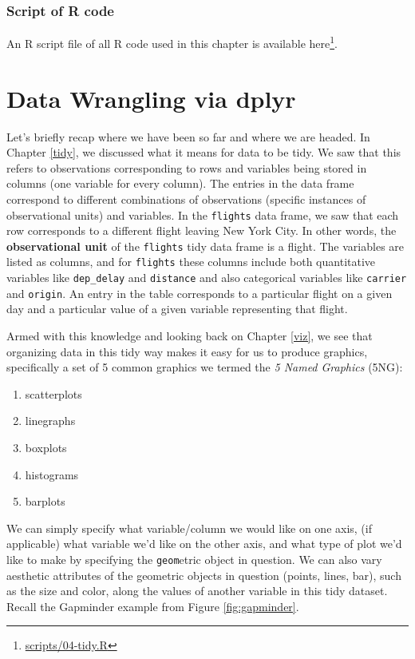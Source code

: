 \documentclass[12pt,]{krantz}
\providecommand{\tightlist}{%
  \setlength{\itemsep}{0pt}\setlength{\parskip}{0pt}}
\renewcommand{\href}[2]{#2\footnote{\url{#1}}}
\theoremstyle{definition}
\theoremstyle{definition}
\theoremstyle{definition}
\theoremstyle{remark}
\begin{document}
\subsection{Script of R code}\label{script-of-r-code-1}

An R script file of all R code used in this chapter is available
\href{scripts/04-tidy.R}{here}.

\chapter{Data Wrangling via dplyr}\label{wrangling}

Let's briefly recap where we have been so far and where we are headed.
In Chapter \ref{tidy}, we discussed what it means for data to be tidy.
We saw that this refers to observations corresponding to rows and
variables being stored in columns (one variable for every column). The
entries in the data frame correspond to different combinations of
observations (specific instances of observational units) and variables.
In the \texttt{flights} data frame, we saw that each row corresponds to
a different flight leaving New York City. In other words, the
\textbf{observational unit} of the \texttt{flights} tidy data frame is a
flight. The variables are listed as columns, and for \texttt{flights}
these columns include both quantitative variables like
\texttt{dep\_delay} and \texttt{distance} and also categorical variables
like \texttt{carrier} and \texttt{origin}. An entry in the table
corresponds to a particular flight on a given day and a particular value
of a given variable representing that flight.

Armed with this knowledge and looking back on Chapter \ref{viz}, we see
that organizing data in this tidy way makes it easy for us to produce
graphics, specifically a set of 5 common graphics we termed the \emph{5
Named Graphics} (5NG):

\begin{enumerate}
\def\labelenumi{\arabic{enumi}.}
\tightlist
\item
  scatterplots
\item
  linegraphs
\item
  boxplots
\item
  histograms
\item
  barplots
\end{enumerate}

We can simply specify what variable/column we would like on one axis,
(if applicable) what variable we'd like on the other axis, and what type
of plot we'd like to make by specifying the \texttt{geom}etric object in
question. We can also vary aesthetic attributes of the geometric objects
in question (points, lines, bar), such as the size and color, along the
values of another variable in this tidy dataset. Recall the Gapminder
example from Figure \ref{fig:gapminder}.
\end{document}

